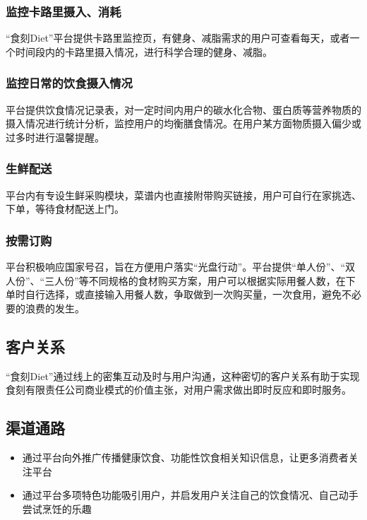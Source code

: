 \documentclass[UTF8,12pt]{ctexart}
\numberwithin{figure}{section}%
\begin{document}
\begin{spacing}{2}
\subsubsection{监控卡路里摄入、消耗}

“食刻Diet”平台提供卡路里监控页，有健身、减脂需求的用户可查看每天，或者一个时间段内的卡路里摄入情况，进行科学合理的健身、减脂。

\subsubsection{监控日常的饮食摄入情况}

平台提供饮食情况记录表，对一定时间内用户的碳水化合物、蛋白质等营养物质的摄入情况进行统计分析，监控用户的均衡膳食情况。在用户某方面物质摄入偏少或过多时进行温馨提醒。

\subsubsection{生鲜配送}

平台内有专设生鲜采购模块，菜谱内也直接附带购买链接，用户可自行在家挑选、下单，等待食材配送上门。

\subsubsection{按需订购}

平台积极响应国家号召，旨在方便用户落实“光盘行动”。平台提供“单人份”、“双人份”、“三人份”等不同规格的食材购买方案，用户可以根据实际用餐人数，在下单时自行选择，或直接输入用餐人数，争取做到一次购买量，一次食用，避免不必要的浪费的发生。

\subsection{客户关系}

“食刻Diet”通过线上的密集互动及时与用户沟通，这种密切的客户关系有助于实现食刻有限责任公司商业模式的价值主张，对用户需求做出即时反应和即时服务。

\subsection{渠道通路}

\begin{itemize}
	\item
	通过平台向外推广传播健康饮食、功能性饮食相关知识信息，让更多消费者关注平台
	
	\item 通过平台多项特色功能吸引用户，并启发用户关注自己的饮食情况、自己动手尝试烹饪的乐趣
	

\end{itemize}
\end{spacing}
\end{document}
